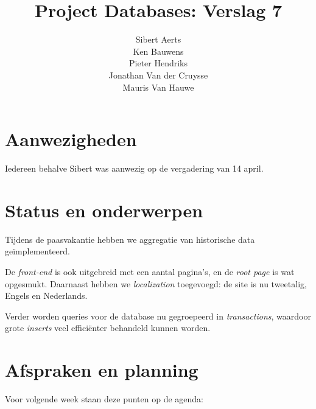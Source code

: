 \documentclass[10pt,a4paper]{article}
\author{Sibert Aerts\\
Ken Bauwens\\
Pieter Hendriks\\
Jonathan Van der Cruysse\\
Mauris Van Hauwe}
\title{Project Databases: Verslag 7}
\date{}
\begin{document}
  \maketitle
  \section{Aanwezigheden}
  Iedereen behalve Sibert was aanwezig op de vergadering van 14 april. 
  
  \section{Status en onderwerpen}
  Tijdens de paasvakantie hebben we aggregatie  van historische data ge\"implemen\-teerd. 
  
  De \emph{front-end} is ook uitgebreid met een aantal pagina's, en de \emph{root page} is wat opgesmukt. Daarnaast hebben we \emph{localization} toegevoegd: de site is nu tweetalig, Engels en Nederlands.
  
  Verder worden queries voor de database nu gegroepeerd in \emph{transactions}, waardoor grote \emph{inserts} veel effici\"enter behandeld kunnen worden.
  
  \section{Afspraken en planning}
  Voor volgende week staan deze punten op de agenda:
  
\end{document}
